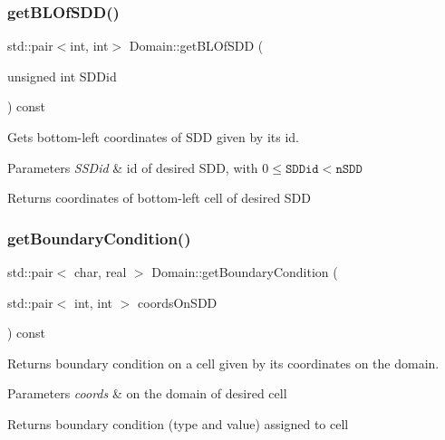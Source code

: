 \subsubsection{\texorpdfstring{get\+B\+L\+Of\+S\+D\+D()}{getBLOfSDD()}\hspace{0.1cm}{\footnotesize\ttfamily [2/2]}}
{\footnotesize\ttfamily std\+::pair$<$int, int$>$ Domain\+::get\+B\+L\+Of\+S\+DD (\begin{DoxyParamCaption}\item[{unsigned int}]{S\+D\+Did }\end{DoxyParamCaption}) const}



Gets bottom-\/left coordinates of S\+DD given by its id. 


\begin{DoxyParams}{Parameters}
{\em S\+S\+Did} & id of desired S\+DD, with $0 \leq \texttt{SDDid} < \texttt{nSDD}$\\
\hline
\end{DoxyParams}
\begin{DoxyReturn}{Returns}
coordinates of bottom-\/left cell of desired S\+DD 
\end{DoxyReturn}
\mbox{\label{classDomain_a1f219d1f46645da98f538dada37432f9}} 
\subsubsection{\texorpdfstring{get\+Boundary\+Condition()}{getBoundaryCondition()}\hspace{0.1cm}{\footnotesize\ttfamily [1/3]}}
{\footnotesize\ttfamily std\+::pair$<$ char, real $>$ Domain\+::get\+Boundary\+Condition (\begin{DoxyParamCaption}\item[{std\+::pair$<$ int, int $>$}]{coords\+On\+S\+DD }\end{DoxyParamCaption}) const}



Returns boundary condition on a cell given by its coordinates on the domain. 


\begin{DoxyParams}{Parameters}
{\em coords} & on the domain of desired cell\\
\hline
\end{DoxyParams}
\begin{DoxyReturn}{Returns}
boundary condition (type and value) assigned to cell 
\end{DoxyReturn}
\mbox{\label{classDomain_a23641933f63bd9b7ff51ee67791823b4}} 
